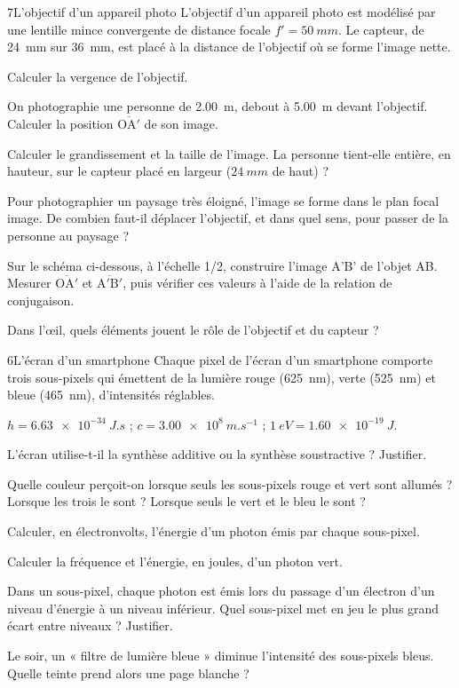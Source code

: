 \begin{exoBac}{7}{L'objectif d'un appareil photo}
L'objectif d'un appareil photo est modélisé par une lentille mince convergente de distance focale $f'=\qty{50}{mm}$. Le capteur, de
\qty{24}{mm} sur \qty{36}{mm}, est placé à la distance de l'objectif où se forme l'image nette.
\begin{questions}
\item Calculer la vergence de l'objectif.
\item On photographie une personne de \qty{2,00}{m}, debout à \qty{5,00}{m} devant l'objectif. Calculer la position $\overline{\mathrm{OA'}}$ de son image.
\item Calculer le grandissement et la taille de l'image. La personne tient-elle entière, en hauteur, sur le capteur placé en
largeur ($\qty{24}{mm}$ de haut) ?
\item Pour photographier un paysage très éloigné, l'image se forme dans le plan focal image. De combien faut-il déplacer
l'objectif, et dans quel sens, pour passer de la personne au paysage ?
\item Sur le schéma ci-dessous, à l'échelle 1/2, construire l'image A'B' de l'objet AB. Mesurer $\overline{\mathrm{OA'}}$ et $\overline{\mathrm{A'B'}}$, puis vérifier
ces valeurs à l'aide de la relation de conjugaison.
\item Dans l'œil, quels éléments jouent le rôle de l'objectif et du capteur ?
\end{questions}
\end{exoBac}

\begin{exoBac}{6}{L'écran d'un smartphone}
Chaque pixel de l'écran d'un smartphone comporte trois sous-pixels qui émettent de la lumière rouge (\qty{625}{nm}), verte (\qty{525}{nm})
et bleue (\qty{465}{nm}), d'intensités réglables.
\begin{donnees}
$h=\qty{6,63e-34}{J.s}$ ; $c=\qty{3,00e8}{m.s^{-1}}$ ; $\qty{1}{eV}=\qty{1,60e-19}{J}$.
\end{donnees}
\begin{questions}
\item L'écran utilise-t-il la synthèse additive ou la synthèse soustractive ? Justifier.
\item Quelle couleur perçoit-on lorsque seuls les sous-pixels rouge et vert sont allumés ? Lorsque les trois le sont ? Lorsque seuls
le vert et le bleu le sont ?
\item Calculer, en électronvolts, l'énergie d'un photon émis par chaque sous-pixel.
\item Calculer la fréquence et l'énergie, en joules, d'un photon vert.
\item Dans un sous-pixel, chaque photon est émis lors du passage d'un électron d'un niveau d'énergie à un niveau inférieur. Quel
sous-pixel met en jeu le plus grand écart entre niveaux ? Justifier.
\item Le soir, un « filtre de lumière bleue » diminue l'intensité des sous-pixels bleus. Quelle teinte prend alors une page blanche ?
\end{questions}
\end{exoBac}
